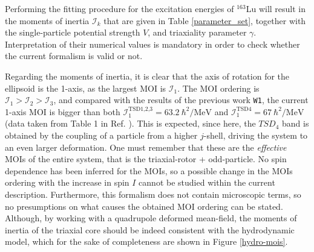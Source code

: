 \documentclass[myclassdoc,debug]{rjparticle}
\begin{document}
Performing the fitting procedure for the excitation energies of $^{163}$Lu will result in the moments of inertia $\mathcal{I}_k$ that are given in Table \ref{parameter_set}, together with the single-particle potential strength $V$, and triaxiality parameter $\gamma$. Interpretation of their numerical values is mandatory in order to check whether the current formalism is valid or not.

Regarding the moments of inertia, it is clear that the axis of rotation for the ellipsoid is the 1-axis, as the largest MOI is $\mathcal{I}_1$. The MOI ordering is $\mathcal{I}_1>\mathcal{I}_2>\mathcal{I}_3$, and compared with the results of the previous work \texttt{W1}, the current 1-axis MOI is bigger than both $\mathcal{I}_1^\text{TSD1,2,3}=63.2\ \hbar^2/\text{MeV}$ and $\mathcal{I}_1^\text{TSD4}=67\ \hbar^2/\text{MeV}$ (data taken from Table 1 in Ref. \cite{raduta2020towards}). This is expected, since here, the $TSD_4$ band is obtained by the coupling of a particle from a higher $j$-shell, driving the system to an even larger deformation. One must remember that these are the \emph{effective} MOIs of the entire system, that is the triaxial-rotor + odd-particle. No spin dependence has been inferred for the MOIs, so a possible change in the MOIs ordering with the increase in spin $I$ cannot be studied within the current description. Furthermore, this formalism does not contain microscopic terms, so no presumptions on what causes the obtained MOI ordering can be stated. Although, by working with a quadrupole deformed mean-field, the moments of inertia of the triaxial core should be indeed consistent with the hydrodynamic model, which for the sake of completeness are shown in Figure \ref{hydro-mois}.
\end{document}
